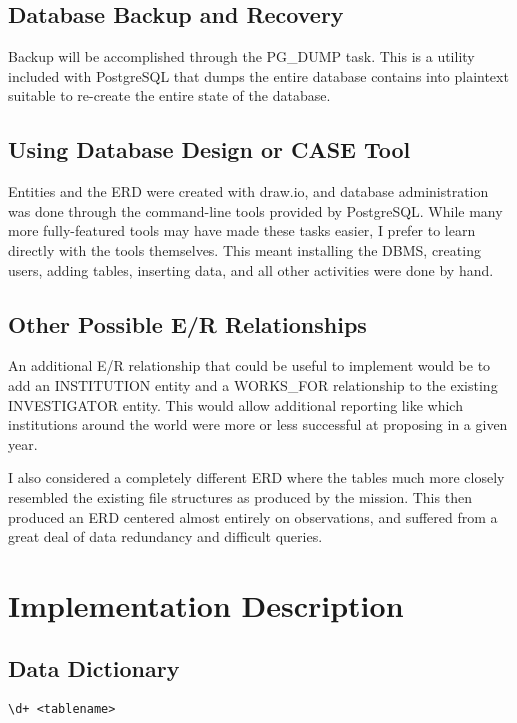 \documentclass[a4paper,11pt]{article}
\begin{document}
\subsection{Database Backup and Recovery}
Backup will be accomplished through the PG\_DUMP task.  This is a utility included with PostgreSQL that dumps the entire database contains into plaintext suitable to re-create the entire state of the database.  

\subsection{Using Database Design or CASE Tool}
Entities and the ERD were created with draw.io, and database administration was done through the command-line tools provided by PostgreSQL.  While many more fully-featured tools may have made these tasks easier, I prefer to learn directly with the tools themselves.  This meant installing the DBMS, creating users, adding tables, inserting data, and all other activities were done by hand. 

\subsection{Other Possible E/R Relationships}
An additional E/R relationship that could be useful to implement would be to add an INSTITUTION entity and a WORKS\_FOR relationship to the existing INVESTIGATOR entity.  This would allow additional reporting like which institutions around the world were more or less successful at proposing in a given year. 

I also considered a completely different ERD where the tables much more closely resembled the existing file structures as produced by the mission.  This then produced an ERD centered almost entirely on observations, and suffered from a great deal of data redundancy and difficult queries. 

\section{Implementation Description}

\subsection{Data Dictionary}
\begin{verbatim}
\d+ <tablename>
\end{verbatim}
\end{document}
